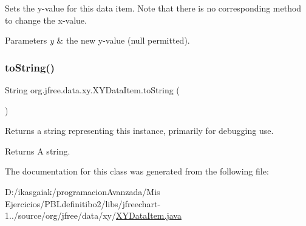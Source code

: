 Sets the y-\/value for this data item. Note that there is no corresponding method to change the x-\/value.


\begin{DoxyParams}{Parameters}
{\em y} & the new y-\/value ({\ttfamily null} permitted). \\
\hline
\end{DoxyParams}
\mbox{\label{classorg_1_1jfree_1_1data_1_1xy_1_1_x_y_data_item_a57c35f2a097ecba4da17bb5d5150014a}} 
\subsubsection{\texorpdfstring{to\+String()}{toString()}}
{\footnotesize\ttfamily String org.\+jfree.\+data.\+xy.\+X\+Y\+Data\+Item.\+to\+String (\begin{DoxyParamCaption}{ }\end{DoxyParamCaption})}

Returns a string representing this instance, primarily for debugging use.

\begin{DoxyReturn}{Returns}
A string. 
\end{DoxyReturn}


The documentation for this class was generated from the following file\+:\begin{DoxyCompactItemize}
\item 
D\+:/ikasgaiak/programacion\+Avanzada/\+Mis Ejercicios/\+P\+B\+Ldefinitibo2/libs/jfreechart-\/1../source/org/jfree/data/xy/\mbox{\hyperlink{_x_y_data_item_8java}{X\+Y\+Data\+Item.\+java}}\end{DoxyCompactItemize}
